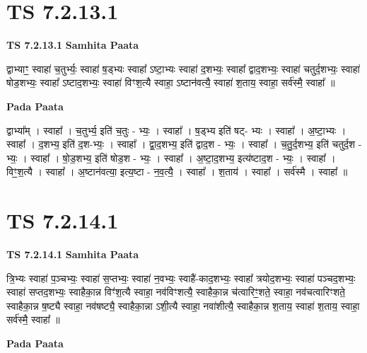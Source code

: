 \documentclass[17pt]{extarticle}
\begin{document}
\section*{ TS 7.2.13.1 }

\textbf{TS 7.2.13.1 } \newline
\textbf{Samhita Paata} \newline

द्वाभ्याꣳ॒॒ स्वाहा॑ च॒तुर्भ्यः॒ स्वाहा॑ ष॒ड्भ्यः स्वाहा᳚ ऽष्टा॒भ्यः स्वाहा॑ द॒शभ्यः॒ स्वाहा᳚ द्वाद॒शभ्यः॒ स्वाहा॑ चतुर्द॒शभ्यः॒ स्वाहा॑ षोड॒शभ्यः॒ स्वाहा᳚ ऽष्टाद॒शभ्यः॒ स्वाहा॑ विꣳश॒त्यै स्वाहा॒ ऽष्टान॑वत्यै॒ स्वाहा॑ श॒ताय॒ स्वाहा॒ सर्व॑स्मै॒ स्वाहा᳚ ॥ \newline

\textbf{Pada Paata} \newline

द्वाभ्या᳚म् । स्वाहा᳚ । च॒तुर्भ्य॒ इति॑ च॒तुः - भ्यः॒ । स्वाहा᳚ । ष॒ड्भ्य इति॑ षट्- भ्यः । स्वाहा᳚ । अ॒ष्टा॒भ्यः । स्वाहा᳚ । द॒शभ्य॒ इति॑ द॒श-भ्यः॒ । स्वाहा᳚ । द्वा॒द॒शभ्य॒ इति॑ द्वाद॒श - भ्यः॒ । स्वाहा᳚ । च॒तु॒र्द॒शभ्य॒ इति॑ चतुर्द॒श - भ्यः॒ । स्वाहा᳚ । षो॒ड॒शभ्य॒ इति॑ षोड॒श - भ्यः॒ । स्वाहा᳚ । अ॒ष्टा॒द॒शभ्य॒ इत्य॑ष्टाद॒श - भ्यः॒ । स्वाहा᳚ । विꣳ॒॒श॒त्यै । स्वाहा᳚ । अ॒ष्टान॑वत्या॒ इत्य॒ष्टा - न॒व॒त्यै॒ । स्वाहा᳚ । श॒ताय॑ । स्वाहा᳚ । सर्व॑स्मै । स्वाहा᳚ ॥  \newline




\section*{ TS 7.2.14.1 }

\textbf{TS 7.2.14.1 } \newline
\textbf{Samhita Paata} \newline

त्रि॒भ्यः स्वाहा॑ प॒ञ्चभ्यः॒ स्वाहा॑ स॒प्तभ्यः॒ स्वाहा॑ न॒वभ्यः॒ स्वाहै॑-काद॒शभ्यः॒ स्वाहा᳚ त्रयोद॒शभ्यः॒ स्वाहा॑ पञ्चद॒शभ्यः॒ स्वाहा॑ सप्तद॒शभ्यः॒ स्वाहैका॒न्न विꣳ॑श॒त्यै स्वाहा॒ नव॑विꣳशत्यै॒ स्वाहैका॒न्न च॑त्वारिꣳ॒॒शते॒ स्वाहा॒ नव॑चत्वारिꣳशते॒ स्वाहैका॒न्न ष॒ष्ट्यै स्वाहा॒ नव॑षष्ट्यै॒ स्वाहैका॒न्ना ऽशी॒त्यै स्वाहा॒ नवा॑शीत्यै॒ स्वाहैका॒न्न श॒ताय॒ स्वाहा॑ श॒ताय॒ स्वाहा॒ सर्व॑स्मै॒ स्वाहा᳚ ॥ \newline

\textbf{Pada Paata} \newline
\end{document}
